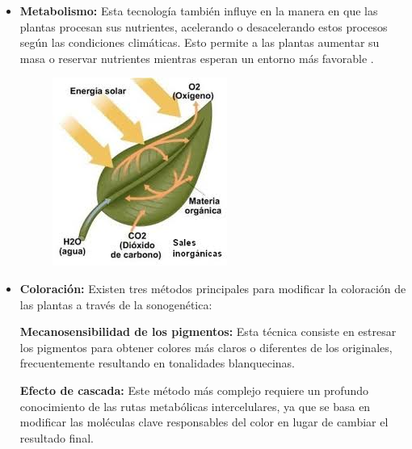 \documentclass[twocolumn]{article}
\begin{document}
\begin{itemize}
\item \textbf{Metabolismo:} Esta tecnología también influye en la manera en que las plantas procesan sus nutrientes, acelerando o desacelerando estos procesos según las condiciones climáticas. Esto permite a las plantas aumentar su masa o reservar nutrientes mientras esperan un entorno más favorable \cite{Ozkurt2016}.
\begin{figure}[!h]
    \centering
    \includegraphics[width=\linewidth]{imagenes/descarga (8).jpeg}       
\end{figure}

\item \textbf{Coloración:} Existen tres métodos principales para modificar la coloración de las plantas a través de la sonogenética:

\subitem \textbf{Mecanosensibilidad de los pigmentos:} Esta técnica consiste en estresar los pigmentos para obtener colores más claros o diferentes de los originales, frecuentemente resultando en tonalidades blanquecinas.
    
\subitem \textbf{Efecto de cascada:} Este método más complejo requiere un profundo conocimiento de las rutas metabólicas intercelulares, ya que se basa en modificar las moléculas clave responsables del color en lugar de cambiar el resultado final.


\end{itemize}
\end{document}
